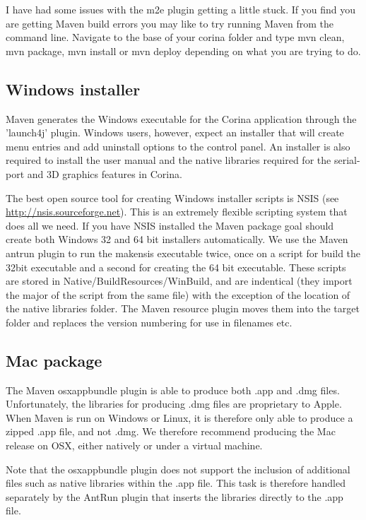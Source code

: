 I have had some issues with the m2e plugin getting a little stuck.  If you find you are getting Maven build errors you may like to try running Maven from the command line.  Navigate to the base of your corina folder and type mvn clean, mvn package, mvn install or mvn deploy depending on what you are trying to do.

\subsection{Windows installer}
\label{txt:windowsInstaller}
Maven generates the Windows executable for the Corina application through the 'launch4j' plugin.  Windows users, however, expect an installer that will create menu entries and add uninstall options to the control panel.  An installer is also required to install the user manual and the native libraries required for the serial-port and 3D graphics features in Corina.  

The best open source tool for creating Windows installer scripts is NSIS (see \url{http://nsis.sourceforge.net}).  This is an extremely flexible scripting system that does all we need.  If you have NSIS installed the Maven package goal should create both Windows 32 and 64 bit installers automatically.  We use the Maven antrun plugin to run the makensis executable twice, once on a script for build the 32bit executable and a second for creating the 64 bit executable.  These scripts are stored in Native/BuildResources/WinBuild, and are indentical (they import the major of the script from the same file) with the exception of the location of the native libraries folder.  The Maven resource plugin moves them into the target folder and replaces the version numbering for use in filenames etc.

\subsection{Mac package}
The Maven osxappbundle plugin is able to produce both .app and .dmg files.  Unfortunately, the libraries for producing .dmg files are proprietary to Apple.  When Maven is run on Windows or Linux, it is therefore only able to produce a  zipped .app file, and not .dmg.  We therefore recommend producing the Mac release on OSX, either natively or under a virtual machine.

Note that the osxappbundle plugin does not support the inclusion of additional files such as native libraries  within the .app file. This task is therefore handled separately by the AntRun plugin that inserts the libraries directly to the .app file.


